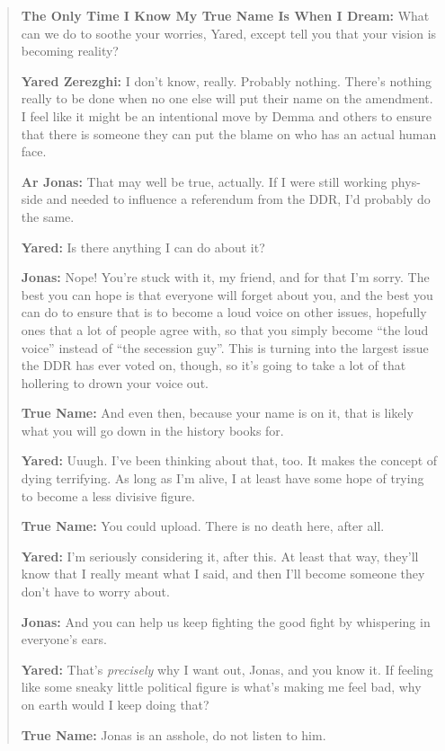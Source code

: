 \begin{quote}
\textbf{The Only Time I Know My True Name Is When I Dream:} What can we do to soothe your worries, Yared, except tell you that your vision is becoming reality?

\textbf{Yared Zerezghi:} I don't know, really. Probably nothing. There's nothing really to be done when no one else will put their name on the amendment. I feel like it might be an intentional move by Demma and others to ensure that there is someone they can put the blame on who has an actual human face.

\textbf{Ar Jonas:} That may well be true, actually. If I were still working phys-side and needed to influence a referendum from the DDR, I'd probably do the same.

\textbf{Yared:} Is there anything I can do about it?

\textbf{Jonas:} Nope! You're stuck with it, my friend, and for that I'm sorry. The best you can hope is that everyone will forget about you, and the best you can do to ensure that is to become a loud voice on other issues, hopefully ones that a lot of people agree with, so that you simply become ``the loud voice'' instead of ``the secession guy''. This is turning into the largest issue the DDR has ever voted on, though, so it's going to take a lot of that hollering to drown your voice out.

\textbf{True Name:} And even then, because your name is on it, that is likely what you will go down in the history books for.

\textbf{Yared:} Uuugh. I've been thinking about that, too. It makes the concept of dying terrifying. As long as I'm alive, I at least have some hope of trying to become a less divisive figure.

\textbf{True Name:} You could upload. There is no death here, after all.

\textbf{Yared:} I'm seriously considering it, after this. At least that way, they'll know that I really meant what I said, and then I'll become someone they don't have to worry about.

\textbf{Jonas:} And you can help us keep fighting the good fight by whispering in everyone's ears.

\textbf{Yared:} That's \emph{precisely} why I want out, Jonas, and you know it. If feeling like some sneaky little political figure is what's making me feel bad, why on earth would I keep doing that?

\textbf{True Name:} Jonas is an asshole, do not listen to him.


\end{quote}
